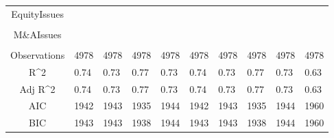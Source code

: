 \documentclass{article}
\begin{document}
\begin{table}[H]
\begin{tabular}{|clllllllll|}
  EquityIssues &  &  &  &  &  &  &  &  &  \\ 
   &  &  &  &  &  &  &  &  &  \\ 
  M\&AIssues &  &  &  &  &  &  &  &  &  \\ 
   &  &  &  &  &  &  &  &  &  \\ 
  \hline 
 Observations & 4978 & 4978 & 4978 & 4978 & 4978 & 4978 & 4978 & 4978 & 4978 \\ 
  R^2 & 0.74 & 0.73 & 0.77 & 0.73 & 0.74 & 0.73 & 0.77 & 0.73 & 0.63 \\ 
  Adj R^2 & 0.74 & 0.73 & 0.77 & 0.73 & 0.74 & 0.73 & 0.77 & 0.73 & 0.63 \\ 
  AIC & 1942 & 1943 & 1935 & 1944 & 1942 & 1943 & 1935 & 1944 & 1960 \\ 
  BIC & 1943 & 1943 & 1938 & 1944 & 1943 & 1943 & 1938 & 1944 & 1960 \\ 
   \hline
\end{tabular}
 
\end{table}
\end{document}
